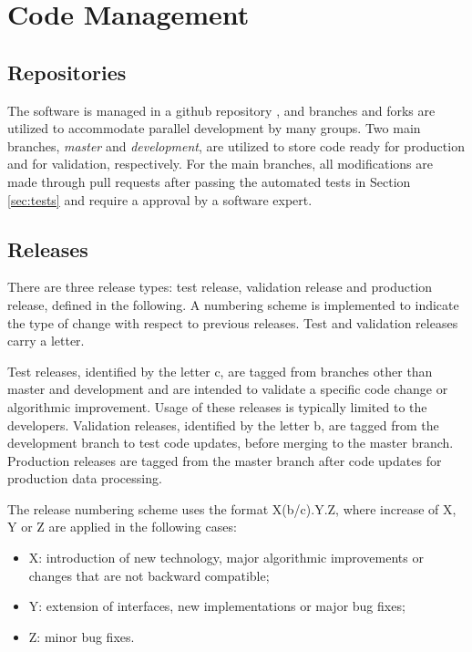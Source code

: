 \section{Code Management}

\subsection{Repositories}
The software is managed in a github repository \cite{recon-github}, and branches and forks are utilized to accommodate parallel development by many groups.  Two main branches, {\it master} and {\it development}, are utilized to store code ready for production and for validation, respectively. For the main branches, all modifications are made through pull requests after passing the automated tests in Section \ref{sec:tests} and require a approval by a software expert.

\subsection{Releases}
There are three release types: test release, validation release and production release, defined in the following. A numbering scheme is implemented to indicate the type of change with respect to previous releases. Test and validation releases carry a letter.

Test releases, identified by the letter c, are tagged from branches other than master and development and are intended to validate a specific code change or algorithmic improvement. Usage of these releases is typically limited to the developers. Validation releases, identified by the letter b, are tagged from the development branch to test code updates, before merging to the master branch. Production releases are tagged from the master branch after code updates for production data processing.

The release numbering scheme uses the format X(b/c).Y.Z, where increase of X, Y or Z are applied in the following cases:
\begin{itemize}
    \item X: introduction of new technology, major algorithmic improvements or changes that are not backward compatible;
    \item Y: extension of interfaces, new implementations or major bug fixes;
    \item Z: minor bug fixes.
\end{itemize}


